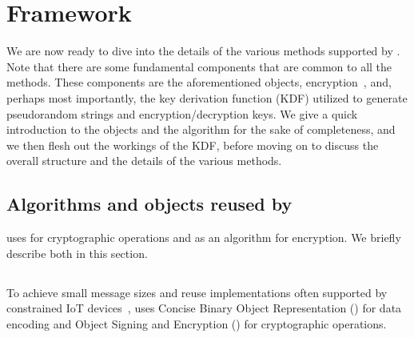 {\section{Framework}
\label{sec:edhocFramework}
We are now ready to dive into the details of the various methods supported by
\mEdhoc. Note that there are some fundamental components that are common to all
the \mEdhoc methods. These components are the aforementioned \mCose{} objects,
\mAead{} encryption~\cite{aead}, and, perhaps most importantly, the key
derivation function (KDF) utilized to generate pseudorandom strings and
encryption/decryption keys. We give a quick introduction to the \mCose{} objects and the \mAead{} algorithm for the sake of completeness, and we then flesh out the workings of the KDF, before moving on to discuss the {overall structure and the details of the various} methods.

\subsection{Algorithms and objects reused by \mEdhoc{}}
\mEdhoc{} uses \mCose{} for cryptographic operations and \mAead{} as an algorithm for encryption. We briefly describe both in this section.

\subsection{\mCose}
To achieve small message sizes and reuse implementations often supported by constrained IoT devices~\cite{Lorawan1,Lorawan2}, \mEdhoc{} uses Concise Binary Object Representation (\mCbor) for data encoding and \mCbor{} Object Signing and Encryption (\mCose) for cryptographic operations. 

}
